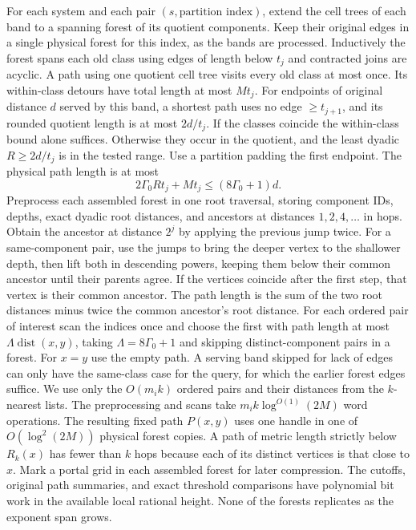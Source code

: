 \documentclass[11pt]{article}
\begin{document}
For each system and each pair \((s,\text{partition index})\), extend the cell trees of each band to a spanning forest of its quotient components. Keep their original edges in a single physical forest for this index, as the bands are processed. Inductively the forest spans each old class using edges of length below \(t_j\) and contracted joins are acyclic. A path using one quotient cell tree visits every old class at most once. Its within-class detours have total length at most \(Mt_j\). For endpoints of original distance \(d\) served by this band, a shortest path uses no edge \(\ge t_{j+1}\), and its rounded quotient length is at most \(2d/t_j\). If the classes coincide the within-class bound alone suffices. Otherwise they occur in the quotient, and the least dyadic \(R\ge2d/t_j\) is in the tested range. Use a partition padding the first endpoint. The physical path length is at most
\[
 2\Gamma_0 R t_j+Mt_j\le (8\Gamma_0+1)d .
\]
Preprocess each assembled forest in one root traversal, storing component IDs, depths, exact dyadic root distances, and ancestors at distances \(1,2,4,\ldots\) in hops. Obtain the ancestor at distance \(2^j\) by applying the previous jump twice. For a same-component pair, use the jumps to bring the deeper vertex to the shallower depth, then lift both in descending powers, keeping them below their common ancestor until their parents agree. If the vertices coincide after the first step, that vertex is their common ancestor. The path length is the sum of the two root distances minus twice the common ancestor's root distance. For each ordered pair of interest scan the indices once and choose the first with path length at most \(\Lambda\operatorname{dist}(x,y)\), taking \(\Lambda=8\Gamma_0+1\) and skipping distinct-component pairs in a forest. For \(x=y\) use the empty path. A serving band skipped for lack of edges can only have the same-class case for the query, for which the earlier forest edges suffice. We use only the \(O(m_i k)\) ordered pairs and their distances from the \(k\)-nearest lists. The preprocessing and scans take \(m_i k\log^{O(1)}(2M)\) word operations. The resulting fixed path \(P(x,y)\) uses one handle in one of \(O(\log^2(2M))\) physical forest copies. A path of metric length strictly below \(R_k(x)\) has fewer than \(k\) hops because each of its distinct vertices is that close to \(x\). Mark a portal grid in each assembled forest for later compression. The cutoffs, original path summaries, and exact threshold comparisons have polynomial bit work in the available local rational height. None of the forests replicates as the exponent span grows.
\end{document}
